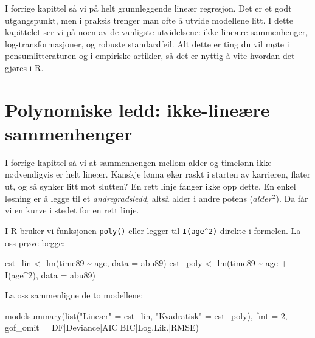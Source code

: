 \documentclass[
  norsk,
  letterpaper,
  DIV=11,
  numbers=noendperiod]{scrreprt}
\newenvironment{Shaded}{\begin{snugshade}}{\end{snugshade}}
\newcommand{\AttributeTok}[1]{\textcolor[rgb]{0.40,0.45,0.13}{#1}}
\newcommand{\DecValTok}[1]{\textcolor[rgb]{0.68,0.00,0.00}{#1}}
\newcommand{\FunctionTok}[1]{\textcolor[rgb]{0.28,0.35,0.67}{#1}}
\newcommand{\NormalTok}[1]{\textcolor[rgb]{0.00,0.23,0.31}{#1}}
\newcommand{\OtherTok}[1]{\textcolor[rgb]{0.00,0.23,0.31}{#1}}
\newcommand{\SpecialCharTok}[1]{\textcolor[rgb]{0.37,0.37,0.37}{#1}}
\newcommand{\StringTok}[1]{\textcolor[rgb]{0.13,0.47,0.30}{#1}}
\theoremstyle{definition}
\theoremstyle{remark}
\begin{document}
I forrige kapittel så vi på helt grunnleggende lineær regresjon. Det er
et godt utgangspunkt, men i praksis trenger man ofte å utvide modellene
litt. I dette kapittelet ser vi på noen av de vanligste utvidelsene:
ikke-lineære sammenhenger, log-transformasjoner, og robuste
standardfeil. Alt dette er ting du vil møte i pensumlitteraturen og i
empiriske artikler, så det er nyttig å vite hvordan det gjøres i R.

\section{Polynomiske ledd: ikke-lineære
sammenhenger}\label{polynomiske-ledd-ikke-lineuxe6re-sammenhenger}

I forrige kapittel så vi at sammenhengen mellom alder og timelønn ikke
nødvendigvis er helt lineær. Kanskje lønna øker raskt i starten av
karrieren, flater ut, og så synker litt mot slutten? En rett linje
fanger ikke opp dette. En enkel løsning er å legge til et
\emph{andregradsledd}, altså alder i andre potens (\(alder^2\)). Da får
vi en kurve i stedet for en rett linje.

I R bruker vi funksjonen \texttt{poly()} eller legger til
\texttt{I(age\^{}2)} direkte i formelen. La oss prøve begge:

\begin{Shaded}
\begin{Highlighting}[]
\NormalTok{est\_lin }\OtherTok{\textless{}{-}} \FunctionTok{lm}\NormalTok{(time89 }\SpecialCharTok{\textasciitilde{}}\NormalTok{ age, }\AttributeTok{data =}\NormalTok{ abu89)}
\NormalTok{est\_poly }\OtherTok{\textless{}{-}} \FunctionTok{lm}\NormalTok{(time89 }\SpecialCharTok{\textasciitilde{}}\NormalTok{ age }\SpecialCharTok{+} \FunctionTok{I}\NormalTok{(age}\SpecialCharTok{\^{}}\DecValTok{2}\NormalTok{), }\AttributeTok{data =}\NormalTok{ abu89)}
\end{Highlighting}
\end{Shaded}

La oss sammenligne de to modellene:

\begin{Shaded}
\begin{Highlighting}[]
\FunctionTok{modelsummary}\NormalTok{(}\FunctionTok{list}\NormalTok{(}\StringTok{"Lineær"} \OtherTok{=}\NormalTok{ est\_lin, }\StringTok{"Kvadratisk"} \OtherTok{=}\NormalTok{ est\_poly),}
             \AttributeTok{fmt =} \DecValTok{2}\NormalTok{,}
             \AttributeTok{gof\_omit =} \StringTok{\textquotesingle{}DF|Deviance|AIC|BIC|Log.Lik.|RMSE\textquotesingle{}}\NormalTok{)}
\end{Highlighting}
\end{Shaded}
\end{document}
